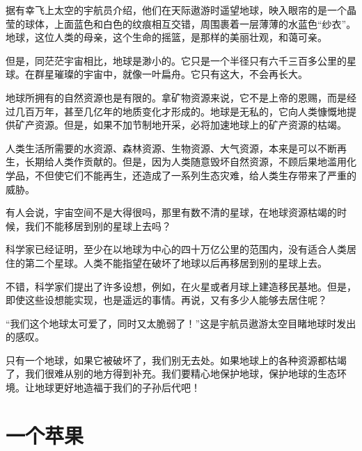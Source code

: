 \documentclass[12pt,UTF-8,openany]{ctexbook}
\begin{document}
\begin{large}
    
    据有幸飞上太空的宇航员介绍，他们在天际遨游时遥望地球，映入眼帘的是一个晶莹的球体，上面蓝色和白色的纹痕相互交错，周围裹着一层薄薄的水蓝色“纱衣”。地球，这位人类的母亲，这个生命的摇篮，是那样的美丽壮观，和蔼可亲。
    
    但是，同茫茫宇宙相比，地球是渺小的。它只是一个半径只有六千三百多公里的星球。在群星璀璨的宇宙中，就像一叶扁舟。它只有这大，不会再长大。
    
    地球所拥有的自然资源也是有限的。拿矿物资源来说，它不是上帝的恩赐，而是经过几百万年，甚至几亿年的地质变化才形成的。地球是无私的，它向人类慷慨地提供矿产资源。但是，如果不加节制地开采，必将加速地球上的矿产资源的枯竭。
    
    人类生活所需要的水资源、森林资源、生物资源、大气资源，本来是可以不断再生，长期给人类作贡献的。但是，因为人类随意毁坏自然资源，不顾后果地滥用化学品，不但使它们不能再生，还造成了一系列生态灾难，给人类生存带来了严重的威胁。
    
    有人会说，宇宙空间不是大得很吗，那里有数不清的星球，在地球资源枯竭的时候，我们不能移居到别的星球上去吗？
    
    科学家已经证明，至少在以地球为中心的四十万亿公里的范围内，没有适合人类居住的第二个星球。人类不能指望在破坏了地球以后再移居到别的星球上去。
    
    不错，科学家们提出了许多设想，例如，在火星或者月球上建造移民基地。但是，即使这些设想能实现，也是遥远的事情。再说，又有多少人能够去居住呢？
    
    “我们这个地球太可爱了，同时又太脆弱了！”这是宇航员遨游太空目睹地球时发出的感叹。
    
    只有一个地球，如果它被破坏了，我们别无去处。如果地球上的各种资源都枯竭了，我们很难从别的地方得到补充。我们要精心地保护地球，保护地球的生态环境。让地球更好地造福于我们的子孙后代吧！
    
\end{large}



\chapter{一个苹果}
\end{document}
